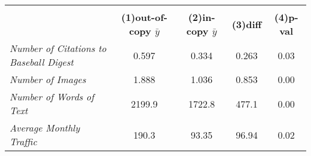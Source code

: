 {
\def\sym#1{\ifmmode^{#1}\else\(^{#1}\)\fi}
\begin{tabular}{l*{1}{cccc}}
\toprule
                    &\multicolumn{4}{c}{}                               \\
                    &\textbf{(1)out-of-copy $\bar{y}$}&\textbf{(2)in-copy $\bar{y}$}&\textbf{(3)diff}&\textbf{(4)p-val}\\
\midrule
\emph{Number of Citations to Baseball Digest}&       0.597&       0.334&       0.263&        0.03\\
\emph{Number of Images}&       1.888&       1.036&       0.853&        0.00\\
\emph{Number of Words of Text}&      2199.9&      1722.8&       477.1&        0.00\\
\emph{Average Monthly Traffic}&       190.3&       93.35&       96.94&        0.02\\
\bottomrule
\end{tabular}
}
